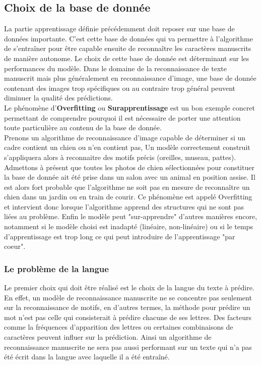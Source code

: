 \documentclass[oneside,a4paper,13pt]{article}
\begin{document}
\subsection{Choix de la base de donnée}


La partie apprentissage définie précédemment doit reposer sur une base de données importante. C'est cette base de données qui va permettre à l'algorithme de s'entraîner pour être capable ensuite de reconnaître les caractères manuscrits de manière autonome. Le choix de cette base de donnée est déterminant sur les performances du modèle. Dans le domaine de la reconnaissance de texte manuscrit mais plus généralement en reconnaissance d'image, une base de donnée contenant des images trop spécifiques ou au contraire trop général peuvent diminuer la qualité des prédictions.\\
Le phénomène d'\textbf{Overfitting} ou \textbf{Surapprentissage} est un bon exemple concret permettant de comprendre pourquoi il est nécessaire de porter une attention toute particulière au contenu de la base de donnée.\\
Prenons un algorithme de reconnaissance d'image capable de déterminer si un cadre contient un chien ou n'en contient pas, Un modèle correctement construit s'appliquera alors à reconnaitre des motifs précis (oreilles, museau, pattes). Admettons à présent que toutes les photos de chien sélectionnées pour constituer la base de donnée ait été prise dans un salon avec un animal en position assise. Il est alors fort probable que l'algorithme ne soit pas en mesure de reconnaître un chien dans un jardin ou en train de courir. Ce phénomène est appelé Overfitting et intervient donc lorsque l'algorithme apprend des structures qui ne sont pas liées au problème. Enfin le modèle peut "sur-apprendre" d'autres manières encore, notamment si le modèle choisi est inadapté (linéaire, non-linéaire) ou si le temps d'apprentissage est trop long ce qui peut introduire de l'apprentissage "par coeur".
\subsubsection{Le problème de la langue}
Le premier choix qui doit être réalisé est le choix de la langue du texte à prédire. En effet, un modèle de reconnaissance manuscrite ne se concentre pas seulement sur la reconnaissance de motifs, en d'autres termes, la méthode pour prédire un mot n'est pas celle qui consisterait à prédire chacune de ses lettres. Des facteurs comme la fréquences d'apparition des lettres ou certaines combinaisons de caractères peuvent influer sur la prédiction. Ainsi un algorithme de reconnaissance manuscrite ne sera pas aussi performant sur un texte qui n'a pas été écrit dans la langue avec laquelle il a été entraîné.
\end{document}
